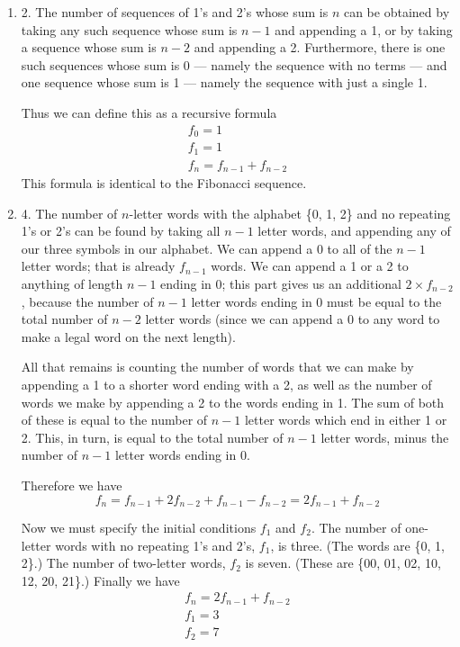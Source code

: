 \documentclass[fleqn]{article}
\newenvironment{answers}{ %
	\begin{enumerate}
		\setlength{\itemsep}{\bigskipamount}
}{\end{enumerate}}
\begin{document}
\begin{answers}
	\item[2.]
	The number of sequences of 1's and 2's whose sum is \(n\) can be obtained by taking any such sequence whose sum is \(n-1\) and appending a 1, or by taking a sequence whose sum is \(n-2\) and appending a 2. Furthermore, there is one such sequences whose sum is 0 --- namely the sequence with no terms --- and one sequence whose sum is 1 --- namely the sequence with just a single 1.

	Thus we can define this as a recursive formula
	\begin{gather*}
		f_0 = 1 \\
		f_1 = 1 \\
		f_n = f_{n-1} + f_{n-2}
	\end{gather*}
	This formula is identical to the Fibonacci sequence.

	\item[4.]
	The number of \(n\)-letter words with the alphabet \{0, 1, 2\} and no repeating 1's or 2's can be found by taking all \(n-1\) letter words, and appending any of our three symbols in our alphabet. We can append a 0 to all of the \(n-1\) letter words; that is already \(f_{n-1}\) words. We can append a 1 or a 2 to anything of length \(n-1\) ending in 0; this part gives us an additional \(2 \times f_{n-2}\), because the number of \(n-1\) letter words ending in 0 must be equal to the total number of \(n-2\) letter words (since we can append a 0 to any word to make a legal word on the next length).

	All that remains is counting the number of words that we can make by appending a 1 to a shorter word ending with a 2, as well as the number of words we make by appending a 2 to the words ending in 1. The sum of both of these is equal to the number of \(n-1\) letter words which end in either 1 or 2. This, in turn, is equal to the total number of \(n-1\) letter words, minus the number of \(n-1\) letter words ending in 0.

	Therefore we have
	\[f_n = f_{n-1} + 2f_{n-2} + f_{n-1} - f_{n-2} = 2f_{n-1} + f_{n-2}\]

	Now we must specify the initial conditions \(f_1\) and \(f_2\). The number of one-letter words with no repeating 1's and 2's, \(f_1\), is three. (The words are \{0, 1, 2\}.) The number of two-letter words, \(f_2\) is seven. (These are \{00, 01, 02, 10, 12, 20, 21\}.) Finally we have
	\begin{gather*}
		f_n = 2f_{n-1} + f_{n-2} \\
		f_1 = 3 \\
		f_2 = 7
	\end{gather*}


\end{answers}
\end{document}
